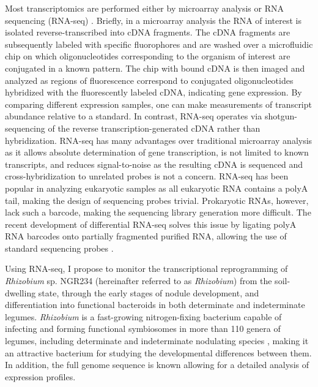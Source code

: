 Most transcriptomics are performed either by microarray analysis
\cite{Rensink:2005da, Guttikonda:2010hq} or RNA sequencing (RNA-seq) \cite{Martin:2013hg,
Wang:2009di}. Briefly, in a microarray analysis the RNA of interest is isolated
reverse-transcribed into cDNA fragments. The cDNA fragments are subsequently
labeled with specific fluorophores and are washed over a microfluidic chip on
which oligonucleotides corresponding to the organism of interest are conjugated
in a known pattern. The chip with bound cDNA is then imaged and analyzed as regions of
fluorescence correspond to conjugated oligonucleotides hybridized with the
fluorescently labeled cDNA, indicating gene expression. By comparing different
expression samples, one can make measurements of transcript abundance relative
to a standard. In contrast, RNA-seq operates via shotgun-sequencing of the
reverse transcription-generated cDNA rather than hybridization. RNA-seq has many
advantages over traditional microarray analysis as it allows absolute determination of
gene transcription, is not limited to known transcripts, and reduces
signal-to-noise as the resulting cDNA is sequenced and cross-hybridization to
unrelated probes is not a concern. RNA-seq has been
popular in analyzing eukaryotic samples as all eukaryotic RNA contains a polyA
tail, making the design of sequencing probes trivial. Prokaryotic RNAs, however,
lack such a barcode, making the sequencing library generation more difficult.
The recent development of differential RNA-seq solves this issue by ligating
polyA RNA barcodes onto partially fragmented purified RNA, allowing the use of
standard sequencing probes \cite{Creecy:2015bk, Sharma:2014ed}.

Using RNA-seq, I propose to monitor the transcriptional reprogramming of
\textit{Rhizobium} sp. NGR234 (hereinafter referred to as \textit{Rhizobium}) from
the soil-dwelling state, through the early stages of nodule development, and
differentiation into functional bacteroids in both determinate and indeterminate
legumes. \textit{Rhizobium} is a fast-growing nitrogen-fixing bacterium capable
of infecting and forming functional symbiosomes in more than 110 genera of
legumes, including determinate and indeterminate nodulating species
\cite{Hussain:2005vu}, making it an attractive bacterium for studying the
developmental differences between them. In addition, the full genome sequence is known
\cite{Schmeisser:2009cp} allowing for a detailed analysis of expression
profiles.  

